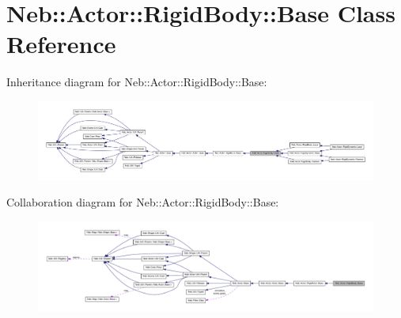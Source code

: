 \hypertarget{classNeb_1_1Actor_1_1RigidBody_1_1Base}{\section{\-Neb\-:\-:\-Actor\-:\-:\-Rigid\-Body\-:\-:\-Base \-Class \-Reference}
\label{classNeb_1_1Actor_1_1RigidBody_1_1Base}
}


\-Inheritance diagram for \-Neb\-:\-:\-Actor\-:\-:\-Rigid\-Body\-:\-:\-Base\-:\nopagebreak
\begin{figure}[H]
\begin{center}
\leavevmode
\includegraphics[width=350pt]{classNeb_1_1Actor_1_1RigidBody_1_1Base__inherit__graph}
\end{center}
\end{figure}


\-Collaboration diagram for \-Neb\-:\-:\-Actor\-:\-:\-Rigid\-Body\-:\-:\-Base\-:\nopagebreak
\begin{figure}[H]
\begin{center}
\leavevmode
\includegraphics[width=350pt]{classNeb_1_1Actor_1_1RigidBody_1_1Base__coll__graph}
\end{center}
\end{figure}
